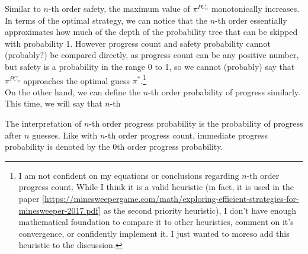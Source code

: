 Similar to $n$-th order safety, the maximum value of $\pi^{PC_n}$ monotonically increases. In terms of the optimal strategy, we can notice that the $n$-th order essentially approximates how much of the depth of the probability tree that can be skipped with probability 1. However progress count and safety probability cannot (probably?) be compared directly, as progress count can be any positive number, but safety is a probability in the range 0 to 1, so we cannot (probably) say that $\pi^{PC_n}$ approaches the optimal guess $\pi^*$.\footnote{I am not confident on my equations or conclusions regarding $n$-th order progress count. While I think it is a valid heuristic (in fact, it is used in the paper [\url{https://minesweepergame.com/math/exploring-efficient-strategies-for-minesweeper-2017.pdf}] as the second priority heuristic), I don't have enough mathematical foundation to compare it to other heuristics, comment on it's convergence, or confidently implement it. I just wanted to moreso add this heuristic to the discussion.}\\

On the other hand, we can define the $n$-th order probability of progress similarly. This time, we will say that $n$-th
\phantom{.}

The interpretation of $n$-th order progress probability is the probability of progress after $n$ guesses. Like with $n$-th order progress count, immediate progress probability is denoted by the 0th order progress probability.\\

